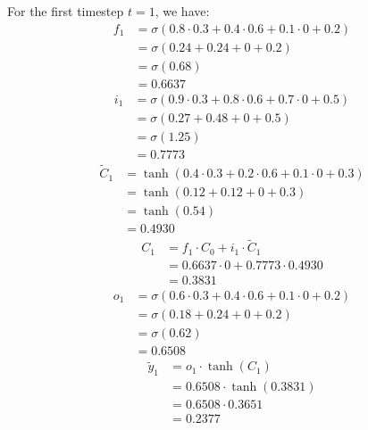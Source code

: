 For the first timestep \( t = 1 \), we have:
\begin{align}
    f_1 &= \sigma(0.8 \cdot 0.3 + 0.4 \cdot 0.6 + 0.1 \cdot 0 + 0.2) \nonumber \\
        &= \sigma(0.24 + 0.24 + 0 + 0.2) \nonumber \\
        &= \sigma(0.68) \nonumber \\
        &= 0.6637
\end{align}
\begin{align}
    i_1 &= \sigma(0.9 \cdot 0.3 + 0.8 \cdot 0.6 + 0.7 \cdot 0 + 0.5) \nonumber \\
        &= \sigma(0.27 + 0.48 + 0 + 0.5) \nonumber \\
        &= \sigma(1.25) \nonumber \\
        &= 0.7773
\end{align}
\begin{align}
    \tilde{C}_1 &= \tanh(0.4 \cdot 0.3 + 0.2 \cdot 0.6 + 0.1 \cdot 0 + 0.3) \nonumber \\
                &= \tanh(0.12 + 0.12 + 0 + 0.3) \nonumber \\
                &= \tanh(0.54) \nonumber \\
                &= 0.4930
\end{align}
\begin{align}
    C_1 &= f_1 \cdot C_0 + i_1 \cdot \tilde{C}_1 \nonumber \\
        &= 0.6637 \cdot 0 + 0.7773 \cdot 0.4930 \nonumber \\
        &= 0.3831
\end{align}
\begin{align}
    o_1 &= \sigma(0.6 \cdot 0.3 + 0.4 \cdot 0.6 + 0.1 \cdot 0 + 0.2) \nonumber \\
        &= \sigma(0.18 + 0.24 + 0 + 0.2) \nonumber \\
        &= \sigma(0.62) \nonumber \\
        &= 0.6508
\end{align}
\begin{align}
    \tilde{y}_1 &= o_1 \cdot \tanh(C_1) \nonumber \\
                &= 0.6508 \cdot \tanh(0.3831) \nonumber \\
                &= 0.6508 \cdot 0.3651 \nonumber \\
                &= 0.2377
\end{align}

